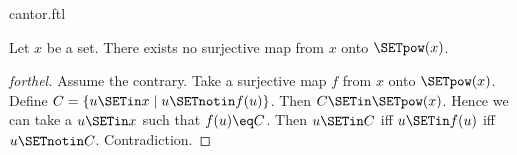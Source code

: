 \documentclass{naproche-library}
\begin{document}
\begin{smodule}[title=Cantor's Theorem]{cantor.ftl}

\begin{theorem}[forthel,title=Cantor's Theorem,id=cantor_017529138285230]
  Let $x$ be a set.
  There exists no surjective map from $x$ onto $\SETpow(x)$.
\end{theorem}
\begin{proof}[forthel]
  Assume the contrary.
  Take a surjective map $f$ from $x$ onto $\SETpow(x)$.
  Define $C = \{ u \SETin x \mid u \SETnotin f(u) \}$.
  Then $C \SETin \SETpow(x)$.
  Hence we can take a $u \SETin x$ such that $f(u) \eq C$.
  Then $u \SETin C$ iff $u \SETin f(u)$ iff $u \SETnotin C$.
  Contradiction.
\end{proof}
\end{smodule}
\end{document}
